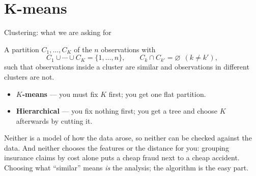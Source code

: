 \documentclass[aspectratio=169,11pt]{beamer}
\begin{document}
\section{K-means}

\begin{frame}{Clustering: what we are asking for}
  \footnotesize
  \begin{readme}
    A partition $C_1,\dots,C_K$ of the $n$ observations with
    \[
      C_1\cup\cdots\cup C_K=\{1,\dots,n\}, \qquad C_k\cap C_{k'}=\varnothing
      \ \ (k\ne k') ,
    \]
    such that observations inside a cluster are similar and observations in different
    clusters are not.
  \end{readme}
  \begin{takeaway}
    \begin{itemize}
      \item \textbf{$K$-means} --- you must fix $K$ first; you get one flat partition.
      \item \textbf{Hierarchical} --- you fix nothing first; you get a tree and choose $K$
            afterwards by cutting it.
    \end{itemize}
    Neither is a model of how the data arose, so neither can be checked against the data.
    And neither chooses the features or the distance for you: grouping insurance claims by
    cost alone puts a cheap fraud next to a cheap accident. Choosing what ``similar'' means
    \emph{is} the analysis; the algorithm is the easy part.
  \end{takeaway}
\end{frame}
\end{document}
